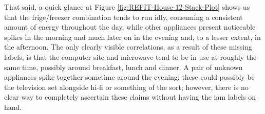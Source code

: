 \begin{figure}[hbt!]
        \begin{adjustwidth}{-3.0cm}{-3.0cm}%
                \myfloatalign
                 \quad
                 \quad
                \caption{}
                \label{fig:REFIT-Stack-IAM-Plot}
        \end{adjustwidth}
\end{figure}

\noindent \newline That said, a quick glance at Figure \ref{fig:REFIT-House-12-Stack-Plot} shows us that the frige/freezer combination tends to run idly, consuming a consistent amount of energy throughout the day, while other appliances present noticeable spikes in the morning and much later on in the evening and, to a lesser extent, in the afternoon. The only clearly visible correlations, as a result of these missing labels, is that the computer site and microwave tend to be in use at roughly the same time, possibly around breakfast, lunch and dinner. A pair of unknown appliances spike together sometime around the evening; these could possibly be the television set alongside hi-fi or something of the sort; however, there is no clear way to completely ascertain these claims without having the \gls{iam} labels on hand.

